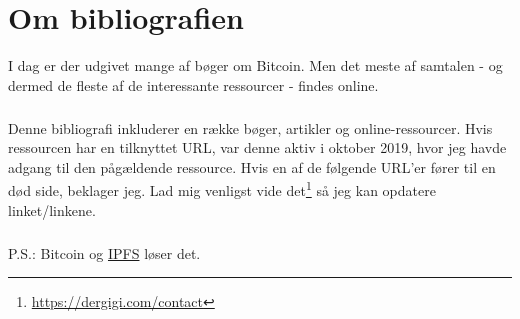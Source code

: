 \documentclass[paper=6in:9in,pagesize=pdftex,
               headinclude=on,footinclude=on,12pt]{scrbook}
\begin{document}
\listoffigures

\chapter*{Om bibliografien}

I dag er der udgivet mange af bøger om Bitcoin. Men det meste af samtalen - og dermed de fleste af de interessante ressourcer - findes online.\paragraph{} Denne bibliografi inkluderer en række bøger, artikler og online-ressourcer. Hvis ressourcen har en tilknyttet URL, var denne aktiv i oktober 2019, hvor jeg havde adgang til den pågældende ressource. Hvis en af de følgende URL'er fører til en død side, beklager jeg. Lad mig venligst vide det\footnote{\url{https://dergigi.com/contact}} så jeg kan opdatere linket/linkene.\paragraph{} P.S.: Bitcoin og \href{https://ipfs.io/}{IPFS} løser det. 


\end{document}
